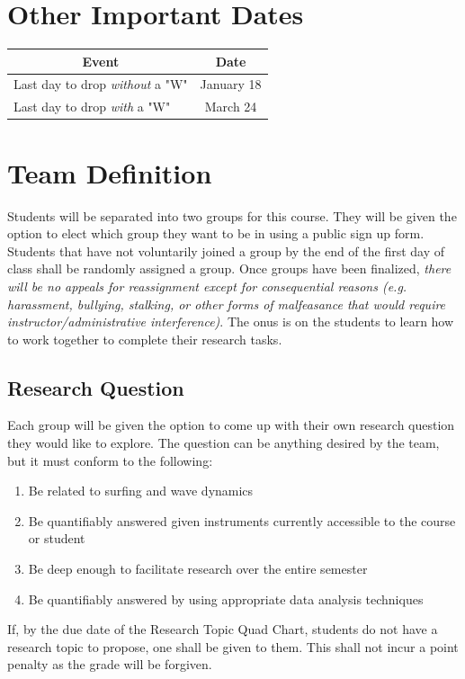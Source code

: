\documentclass[
	letterpaper, %
	fontsize=10pt, %
	twoside=true, %
	numbers=noenddot, %
]{kaobook}
\begin{document}
\section*{Other Important Dates} 
\begin{table}[h!]
    \begin{tabular}{ l | c }
        \toprule
        \multicolumn{1}{c|}{\textbf{Event}} & \textbf{Date} \\
        \midrule
        Last day to drop \emph{without} a "W"  & January 18 \\
        Last day to drop \emph{with} a "W"     & March 24   \\
        \bottomrule
    \end{tabular}
\end{table}

\section*{Team Definition} 
Students will be separated into two groups for this course.
They will be given the option to elect which group they want to be in using a public sign up form.
Students that have not voluntarily joined a group by the end of the first day of class shall be randomly assigned a group.
Once groups have been finalized, \emph{there will be no appeals for reassignment except for consequential reasons (e.g. harassment, bullying, stalking, or other forms of malfeasance that would require instructor/administrative interference)}.
The onus is on the students to learn how to work together to complete their research tasks.

\subsection*{Research Question} \label{ssec:research_question}
Each group will be given the option to come up with their own research question they would like to explore.
The question can be anything desired by the team, but it must conform to the following:
\begin{enumerate}
    \item Be related to surfing and wave dynamics
    \item Be quantifiably answered given instruments currently accessible to the course or student
    \item Be deep enough to facilitate research over the entire semester
    \item Be quantifiably answered by using appropriate data analysis techniques
\end{enumerate}
If, by the due date of the Research Topic Quad Chart, students do not have a research topic to propose, one shall be given to them. 
This shall not incur a point penalty as the grade will be forgiven.
\end{document}
